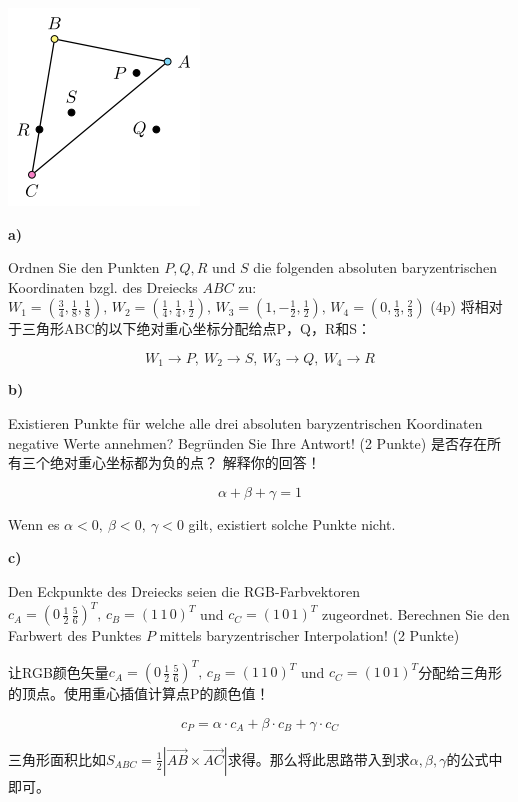 \documentclass[fleqn]{article}
\begin{document}
\begin{center}
    \includegraphics[scale=0.6]{13.png}
\end{center}

\noindent\textbf{a)} 

Ordnen Sie den Punkten $P, Q, R$ und $S$ die folgenden absoluten baryzentrischen Koordinaten bzgl. des Dreiecks $ABC$ zu:
$W_1=(\frac{3}{4},\frac{1}{8},\frac{1}{8}),\,W_2=(\frac{1}{4},\frac{1}{4},\frac{1}{2}),\,W_3=(1,-\frac{1}{2},\frac{1}{2}),\,W_4=(0,\frac{1}{3},\frac{2}{3})$ (4p)
将相对于三角形ABC的以下绝对重心坐标分配给点P，Q，R和S：

$$W_1 \rightarrow P,\ W_2 \rightarrow S,\ W_3 \rightarrow Q,\ W_4 \rightarrow R$$

\noindent\textbf{b)} 

Existieren Punkte für welche alle drei absoluten baryzentrischen Koordinaten negative Werte annehmen? Begründen Sie Ihre Antwort! (2 Punkte)
是否存在所有三个绝对重心坐标都为负的点？ 解释你的回答！

$$\alpha + \beta + \gamma = 1$$

Wenn es $\alpha<0,\ \beta<0,\ \gamma<0$ gilt, existiert solche Punkte nicht.

\noindent\textbf{c)} 

Den Eckpunkte des Dreiecks seien die RGB-Farbvektoren $c_A=(0\,\frac{1}{2}\,\frac{5}{6})^T,\,c_B=(1\,1\,0)^T$ und $c_C=(1\,0\,1)^T$ zugeordnet. Berechnen Sie den Farbwert des Punktes $P$ mittels baryzentrischer Interpolation! (2 Punkte)

让RGB颜色矢量$c_A=(0\,\frac{1}{2}\,\frac{5}{6})^T,\,c_B=(1\,1\,0)^T$ und $c_C=(1\,0\,1)^T$分配给三角形的顶点。使用重心插值计算点P的颜色值！

$$c_P=\alpha \cdot c_A + \beta\cdot c_B+ \gamma\cdot c_C$$

三角形面积比如$S_{ABC}=\frac{1}{2}|\overrightarrow{AB}\times\overrightarrow{AC}|$求得。那么将此思路带入到求$\alpha,\beta,\gamma$的公式中即可。

\end{document}
